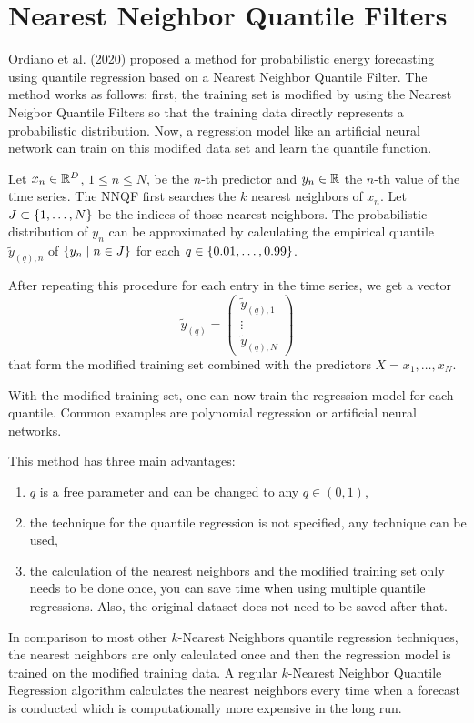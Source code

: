 \section{Nearest Neighbor Quantile Filters}
\label{sec:nnqf}

Ordiano et al. (2020) proposed a method for probabilistic 
energy forecasting using quantile regression based on a Nearest Neighbor 
Quantile Filter. 
The method works as follows: first, the training set is modified 
by using the Nearest Neigbor Quantile Filters so that 
the training data directly represents a probabilistic distribution. 
Now, a regression model like an artificial neural network can 
train on this modified data set and learn the quantile function.

Let \(x_n \in \mathbb{R}^D\), \(1 \leq n \leq N\), be the \(n\)-th predictor 
and \(y_n \in \mathbb{R}\) the \(n\)-th value of the time series. 
The NNQF first searches the \(k\) nearest neighbors of \(x_n\). 
Let \(J \subset \{1, \ldots, N\}\) be the indices of 
those nearest neighbors. 
The probabilistic distribution of \(y_n\) can be approximated 
by calculating the empirical quantile \(\tilde{y}_{(q),n}\) of 
\(\{y_n \;|\; n\in J\}\) for each \(q \in \{0.01, \ldots, 0.99\}\). 

After repeating this procedure for each entry in the time series, 
we get a vector 
\[ \tilde{y}_{(q)} = \begin{pmatrix}
    \tilde{y}_{(q), 1} \\ 
    \vdots \\
    \tilde{y}_{(q), N}
\end{pmatrix} \]
that form the modified training set combined with the 
predictors \(X = x_1, \ldots, x_N\).

With the modified training set, one can now train the regression model 
for each quantile. Common examples are polynomial regression or 
artificial neural networks. 

This method has three main advantages: 
\begin{enumerate}
    \item \(q\) is a free parameter and can be changed to any \(q \in (0,1)\),
    \item the technique for the quantile regression is not specified, 
    any technique can be used,
    \item the calculation of the nearest neighbors and the modified 
    training set only needs to be done once, you can save time when 
    using multiple quantile regressions. Also, the original dataset 
    does not need to be saved after that.
\end{enumerate}

In comparison to most other \(k\)-Nearest Neighbors quantile 
regression techniques, the nearest neighbors are only calculated once 
and then the regression model is trained on the modified training data. 
A regular \(k\)-Nearest Neighbor Quantile Regression algorithm 
calculates the nearest neighbors every time when a forecast is conducted 
which is computationally more expensive in the long run.